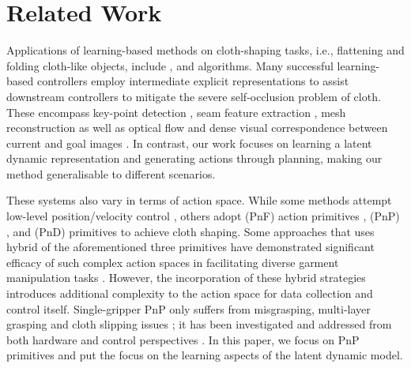 \documentclass[journal]{IEEEtran}
\begin{document}
\section{Related Work} \label{sec:related-workd}


\noindent Applications of learning-based methods on cloth-shaping tasks, i.e., flattening and folding cloth-like objects, include  \cite{matas2018sim,wu2020learning,ha2022flingbot,hietala2022learning,lin2020softgym,lee2021learning, canberk2023cloth, he2024fabricfolding, gu2023learning, avigal2022speedfolding},  \cite{yan2021learning,hoque2022visuospatial,ma2021learning,arnold2023cloth,lin2020softgym,lin2022learning, huang2022mesh} and   \cite{lips2024learning,weng2022fabricflownet, teng2022multidimensional, mo2022foldsformer, huang2025sis, chi2023diffusionpolicy} algorithms. Many successful learning-based  controllers employ intermediate explicit representations to assist downstream controllers to mitigate the severe self-occlusion problem of cloth. These encompass key-point detection \cite{lips2024learning, gusseme2025insights}, seam feature extraction \cite{huang2025sis}, mesh reconstruction \cite{huang2022mesh} as well as optical flow \cite{weng2022fabricflownet} and dense visual correspondence between current and goal images \cite{wu2024unigarmentmanip}. In contrast, our work focuses on learning a latent dynamic representation and generating actions through planning, making our method generalisable to different scenarios.

These systems also vary in terms of action space. While some methods attempt low-level position/velocity control \cite{matas2018sim,lin2020softgym, hietala2022learning,ha2022flingbot}, others adopt   (PnF) action primitives \cite{doumanoglou2014autonomous},  (PnP)  \cite{sun2015accurate}, and  (PnD) primitives \cite{he2024fabricfolding} to achieve cloth shaping. Some  approaches that uses hybrid of the aforementioned three primitives have demonstrated significant efficacy of such complex action spaces in facilitating diverse garment manipulation tasks \cite{avigal2022speedfolding, canberk2023cloth}. However, the incorporation of these hybrid strategies introduces additional complexity to the action space for data collection and control itself. Single-gripper PnP only suffers from misgrasping, multi-layer grasping and cloth slipping issues \cite{lin2022learning, hoque2022visuospatial}; it has been investigated and addressed from both hardware and control perspectives \cite{kadi2025draper, hoque2021lazydagger}. In this paper, we focus on PnP primitives and put the focus on the learning aspects of the latent dynamic model.
\end{document}
